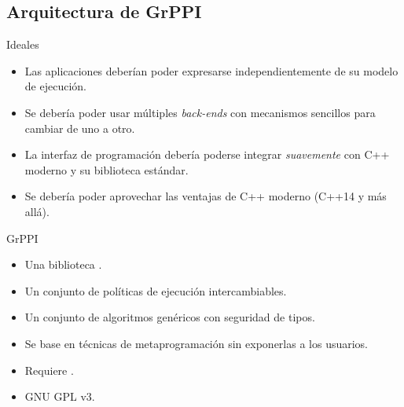 \subsection{Arquitectura de GrPPI}

\begin{frame}[t]{Ideales}
\begin{itemize}[<+->]
  \item Las aplicaciones deberían poder expresarse independientemente
        de su modelo de ejecución.
  \item Se debería poder usar múltiples \emph{back-ends} con mecanismos
        sencillos para cambiar de uno a otro.
  \item La interfaz de programación debería poderse integrar \emph{suavemente}
        con C++ moderno y su biblioteca estándar.
  \item Se debería poder aprovechar las ventajas de C++ moderno (C++14 y más allá).
\end{itemize}
\end{frame}

\begin{frame}[t]{GrPPI}
\begin{Large}
\end{Large}
\vfill\pause
\begin{itemize}
  \item Una biblioteca .
  \item Un conjunto de políticas de ejecución intercambiables.
  \item Un conjunto de algoritmos genéricos con seguridad de tipos.
  \item Se base en técnicas de metaprogramación sin exponerlas a los usuarios.
  \item Requiere .
  \item GNU GPL v3.
\end{itemize}
\end{frame}

